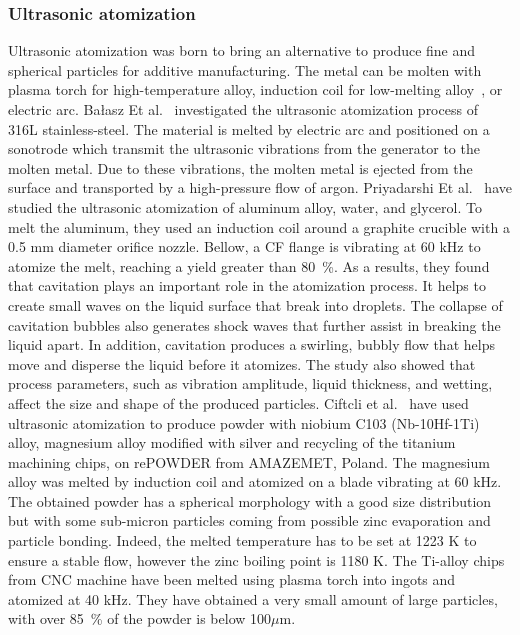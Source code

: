 \documentclass[../main]{subfiles}
\begin{document}
\subsubsection{Ultrasonic atomization}

Ultrasonic atomization was born to bring an alternative to produce fine and spherical particles for additive manufacturing. The metal can be molten with plasma torch for high-temperature alloy, induction coil for low-melting alloy~\cite{Ciftcli2025AlloyDevelopment}, or electric arc. Bałasz Et al.~\cite{Balasz2024InvestigationMetal} investigated the ultrasonic atomization process of 316L stainless-steel. The material is melted by electric arc and positioned on a sonotrode which transmit the ultrasonic vibrations from the generator to the molten metal. Due to these vibrations, the molten metal is ejected from the surface and transported by a high-pressure flow of argon. Priyadarshi Et al.~\cite{Priyadarshi2024NewInsights} have studied the ultrasonic atomization of aluminum alloy, water, and glycerol. To melt the aluminum, they used an induction coil around a graphite crucible with a 0.5 mm diameter orifice nozzle. Bellow, a CF flange is vibrating at 60 kHz to atomize the melt, reaching a yield greater than 80~\%. As a results, they found that cavitation plays an important role in the atomization process. It helps to create small waves on the liquid surface that break into droplets. The collapse of cavitation bubbles also generates shock waves that further assist in breaking the liquid apart. In addition, cavitation produces a swirling, bubbly flow that helps move and disperse the liquid before it atomizes. The study also showed that process parameters, such as vibration amplitude, liquid thickness, and wetting, affect the size and shape of the produced particles. Ciftcli et al.~\cite{Ciftcli2025AlloyDevelopment} have used ultrasonic atomization to produce powder with niobium C103 (Nb-10Hf-1Ti) alloy, magnesium alloy modified with silver and recycling of the titanium machining chips, on rePOWDER from AMAZEMET, Poland. The magnesium alloy was melted by induction coil and atomized on a blade vibrating at 60 kHz. The obtained powder has a spherical morphology with a good size distribution but with some sub-micron particles coming from possible zinc evaporation and particle bonding. Indeed, the melted temperature has to be set at 1223 K to ensure a stable flow, however the zinc boiling point is 1180 K. The Ti-alloy chips from CNC machine have been melted using plasma torch into ingots and atomized at 40 kHz. They have obtained a very small amount of large particles, with over 85~\% of the powder is below 100$\mu$m.\\
\end{document}
